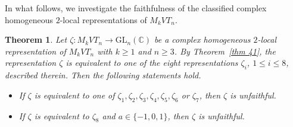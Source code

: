 \documentclass[preprint]{elsarticle}
\newtheorem{theorem}{Theorem}[section]
\begin{document}
In what follows, we investigate the faithfulness of the classified complex homogeneous \(2\)-local representations of \(M_kVT_n\).

\begin{theorem}
Let $
\zeta : M_kVT_n \longrightarrow \mathrm{GL}_n(\mathbb{C})$
be a complex homogeneous \(2\)-local representation of \(M_kVT_n\) with $k \geq 1$ and \(n \ge 3\).
By Theorem~\ref{thm 41}, the representation $\zeta$ is equivalent to one of the eight
representations $\zeta_i$, $1 \le i \le 8$, described therein.
Then the following statements hold.
\begin{itemize}
    \item[(a)] If \(\zeta\) is equivalent to one of $\zeta_1, \zeta_2,\zeta_3,\zeta_4,\zeta_5,\zeta_6$  or $\zeta_7$, then \(\zeta\) is  unfaithful.
    \item[(b)] If \(\zeta\) is equivalent to $\zeta_8$ and $a\in \{-1,0,1\}$, then \(\zeta\) is unfaithful.
    \end{itemize}
\end{theorem}
\end{document}
